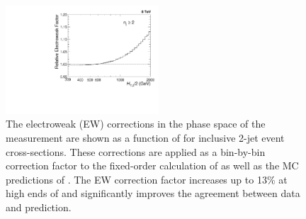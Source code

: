 \begin{figure}[!t]
 \begin{center}
 \includegraphics[width=0.51\textwidth]{Plots_HT_2_150/EW_2.pdf}
 \caption[The electroweak (EW) corrections as a function of \httwo.]{The electroweak (EW) corrections \cite{Dittmaier:2012kx} in the phase space of the measurement are shown as a function of \httwo for inclusive 2-jet event cross-sections. These corrections are applied as a bin-by-bin correction factor to the fixed-order calculation of \NLOJETPP as well as the MC predictions of \MadGraphFn\plusn \PYTHIAS. The EW correction factor increases up to 13\% at high ends of \httwo and significantly improves the agreement between data and prediction.}
 \label{fig:EW}
 \end{center}
\end{figure}

